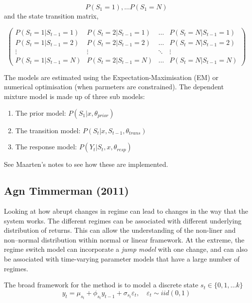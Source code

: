 \documentclass[12pt, a4paper, oneside]{article} %
\begin{document}
\begin{equation*}
P(S_1 = 1), \dots P(S_1 = N)
\end{equation*}
and the state transition matrix, 

\begin{equation*}
\begin{pmatrix}
P(S_t = 1|S_{t-1}=1) & P(S_t = 2|S_{t-1}=1) & \dots & P(S_t = N|S_{t-1}=1)\\
P(S_t = 1|S_{t-1}=2) & P(S_t = 2|S_{t-1}=2) & \dots & P(S_t = N|S_{t-1}=2)\\
\vdots & \vdots & \ddots & \vdots \\
P(S_t = 1|S_{t-1}=N) & P(S_t = 2|S_{t-1}=N) & \dots & P(S_t = N|S_{t-1}=N)
\end{pmatrix}
\end{equation*}

The models are estimated using the Expectation-Maximisation (EM) or numerical optimisation (when parmeters are constrained).  The dependent mixture model is made up of three sub models:  
\begin{enumerate}
\item The prior model: $P(S_1|x, \theta_{prior})$
\item The transition model: $P(S_t|x, S_{t-1}, \theta_{trans})$
\item The response model: $P(Y_t| S_t, x, \theta_{resp})$
\end{enumerate}
 See Maarten's notes to see how these are implemented.  
 
\subsection{Agn Timmerman (2011)}
Looking at how abrupt changes in regime can lead to changes in the way that the system works.  The different regimes can be associated with different underlying distribution of returns.  This can allow the understanding of the non-liner and non--normal distribution within  normal or linear framework.  At the extreme, the regime switch model can incorporate a \emph{jump model} with one change, and can also be associated with time-varying parameter models that have a large number of regimes.

The broad framework for the method is to model a discrete state $s_t \in \{0,1,\dots k \}$
\begin{equation}
y_t = \mu_{s_t} + \phi_{s_t} y_{t-1} + \sigma_{s_t} \varepsilon_t, \quad \varepsilon_t \sim iid(0,1) 
\end{equation}
\end{document}
